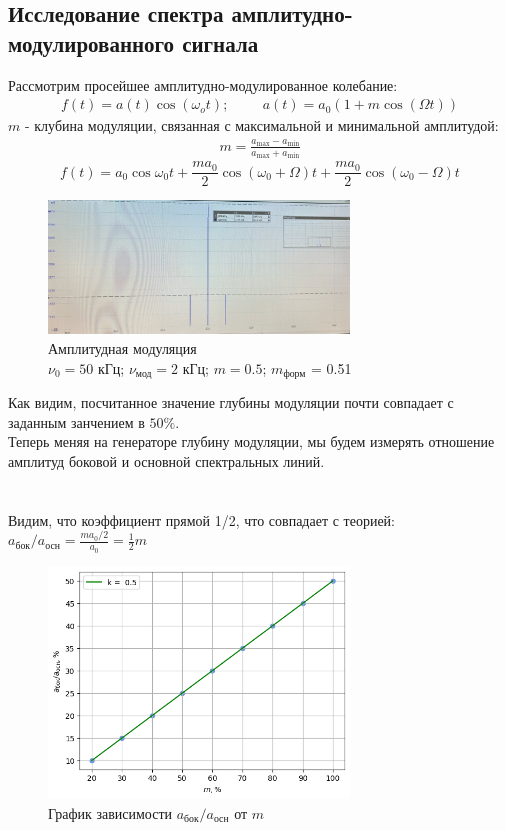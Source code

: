 \newpage
\subsection*{Исследование спектра амплитудно-модулированного сигнала}
Рассмотрим просейшее амплитудно-модулированное колебание:
\begin{align}
    f(t) = a(t)\cos(\omega_o t); \hspace{1cm} a(t) = a_0(1 + m\cos(\Omega t))
\end{align}
$m$ - клубина модуляции, связанная с максимальной и минимальной амплитудой:
\begin{align}
    m = \frac{a_{\text{max}} - a_{\text{min}}}{a_{\text{max}} + a_{\text{min}}}
\end{align}
$$ 
f(t) = a_0\cos\omega_0 t + \frac{ma_0}{2}\cos(\omega_0 + \Omega)t + \frac{ma_0}{2}\cos(\omega_0 - \Omega)t
$$
\begin{figure}
    \centering
    \includegraphics[width=8cm]{./images/m_50_nu_50.jpg}
    \caption{Амплитудная модуляция\\$\nu_0 = 50$ кГц; $\nu_{\text{мод}} = 2$ кГц; $m = 0.5$; $m_{\text{форм}}$ = 0.51 }
\end{figure}

Как видим, посчитанное значение глубины модуляции почти совпадает с заданным занчением в $50\%$.
\\\indent Теперь меняя на генераторе глубину модуляции, мы будем измерять отношение амплитуд боковой и основной спектральных линий.\\\\\\

Видим, что коэффициент прямой 1/2, что совпадает с теорией:
$a_{\text{бок}} / a_{\text{осн}} = \frac{ma_0 / 2}{a_0} = \frac{1}{2}m$
\begin{figure}
        \centering
        \includegraphics[width=8cm]{plot3.png}
        \caption{График зависимости $a_{\text{бок}} / a_{\text{осн}}$ от $m$}
\end{figure}
\newpage
